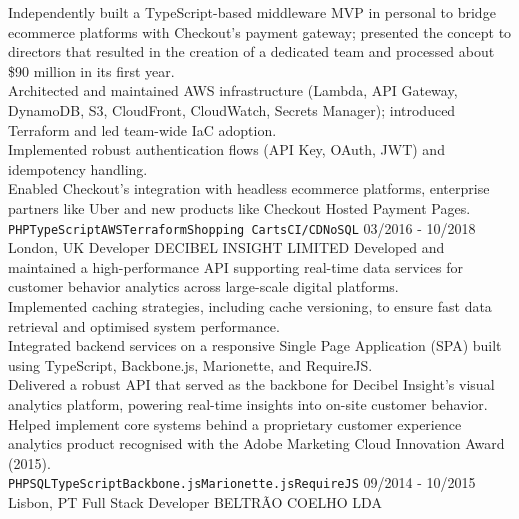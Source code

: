 \documentclass[9pt]{lib/developercv} %
\begin{document}
\begin{entrylist}
{			Independently built a TypeScript-based middleware MVP in personal to bridge ecommerce platforms with Checkout's payment gateway; presented the concept to directors that resulted in the creation of a dedicated team and processed about \$90 million in its first year.\\
			Architected and maintained AWS infrastructure (Lambda, API Gateway, DynamoDB, S3, CloudFront, CloudWatch, Secrets Manager); introduced Terraform and led team-wide IaC adoption.\\
			Implemented robust authentication flows (API Key, OAuth, JWT) and idempotency handling.\\
			Enabled Checkout's integration with headless ecommerce platforms, enterprise partners like Uber and new products like Checkout Hosted Payment Pages.\\
			\texttt{PHP}\slashsep\texttt{TypeScript}\slashsep\texttt{AWS}\slashsep\texttt{Terraform}\slashsep\texttt{Shopping Carts}\slashsep\texttt{CI/CD}\slashsep\texttt{NoSQL}
		}
	\entry
		{03/2016 - 10/2018\\\footnotesize{London, UK}}
		{Developer}
		{DECIBEL INSIGHT LIMITED}
		{
			Developed and maintained a high-performance API supporting real-time data services for customer behavior analytics across large-scale digital platforms.\\
			Implemented caching strategies, including cache versioning, to ensure fast data retrieval and optimised system performance.\\
			Integrated backend services on a responsive Single Page Application (SPA) built using TypeScript, Backbone.js, Marionette, and RequireJS.\\
			Delivered a robust API that served as the backbone for Decibel Insight's visual analytics platform, powering real-time insights into on-site customer behavior.\\
			Helped implement core systems behind a proprietary customer experience analytics product recognised with the Adobe Marketing Cloud Innovation Award (2015).\\
			\texttt{PHP}\slashsep\texttt{SQL}\slashsep\texttt{TypeScript}\slashsep\texttt{Backbone.js}\slashsep\texttt{Marionette.js}\slashsep\texttt{RequireJS}
		}
	\entry
		{09/2014 - 10/2015\\\footnotesize{Lisbon, PT}}
		{Full Stack Developer}
		{BELTRÃO COELHO LDA}
		{

}
\end{entrylist}
\end{document}
